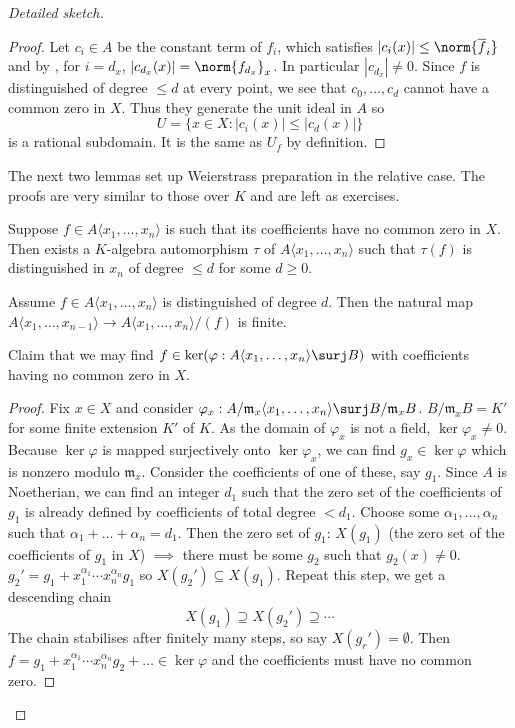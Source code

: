 \documentclass[a4paper]{article}
\begin{document}
\begin{proof}[Detailed sketch]
\begin{proof}
    Let \(c_i \in A\) be the constant term of \(f_i\), which satisfies \(|c_i(x)| \leq \norm{\overline f_i}\) and by , for \(i = d_x\), \(|c_{d_x}(x)| = \norm{f_{d_x}}_x\). In particular \(|c_{d_x}| \ne 0\). Since \(f\) is distinguished of degree \(\leq d\) at every point, we see that \(c_0, \dots, c_d\) cannot have a common zero in \(X\). Thus they generate the unit ideal in \(A\) so
    \[
      U = \{x \in X: |c_i(x)| \leq |c_d(x)|\}
    \]
    is a rational subdomain. It is the same as \(U_f\) by definition.
  \end{proof}

  The next two lemmas set up Weierstrass preparation in the relative case. The proofs are very similar to those over \(K\) and are left as exercises.
  
  \begin{lemma}
    Suppose \(f \in A \langle x_1, \dots, x_n \rangle\) is such that its coefficients have no common zero in \(X\). Then exists a \(K\)-algebra automorphism \(\tau\) of \(A \langle x_1, \dots, x_n\rangle\) such that \(\tau(f)\) is distinguished in \(x_n\) of degree \(\leq d\) for some \(d \geq 0\).
  \end{lemma}

  \begin{lemma}
    Assume \(f \in A\langle x_1, \dots, x_n \rangle\) is distinguished of degree \(d\). Then the natural map \(A \langle x_1, \dots, x_{n - 1} \rangle \to A \langle x_1, \dots, x_n\rangle/(f)\) is finite.
  \end{lemma}

  Claim that we may find \(f \in \ker (\varphi: A \langle x_1, \dots, x_n \rangle \surj B)\) with coefficients having no common zero in \(X\).

  \begin{proof}
    Fix \(x \in X\) and consider \(\varphi_x: A/\mathfrak m_x\langle x_1, \dots, x_n \rangle \surj B/\mathfrak m_x B\). \(B/\mathfrak m_x B = K'\) for some finite extension \(K'\) of \(K\). As the domain of \(\varphi_x\) is not a field, \(\ker \varphi_x \ne 0\). Because \(\ker \varphi\) is mapped surjectively onto \(\ker \varphi_x\), we can find \(g_x \in \ker \varphi\) which is nonzero modulo \(\mathfrak m_x\). Consider the coefficients of one of these, say \(g_1\). Since \(A\) is Noetherian, we can find an integer \(d_1\) such that the zero set of the coefficients of \(g_1\) is already defined by coefficients of total degree \(< d_1\). Choose some \(\alpha_1, \dots, \alpha_n\) such that \(\alpha_1 + \dots + \alpha_n = d_1\). Then the zero set of \(g_1\): \(X(g_1)\) (the zero set of the coefficients of \(g_1\) in \(X\)) \(\implies\) there must be some \(g_2\) such that \(g_2(x) \ne 0\). \(g_2' = g_1 + x_1^{\alpha_1} \cdots x_n^{\alpha_n} g_1\) so \(X(g_2') \subseteq X(g_1)\). Repeat this step, we get a descending chain
    \[
      X(g_1) \supseteq X(g_2') \supseteq \cdots
    \]
    The chain stabilises after finitely many steps, so say \(X(g_r') = \emptyset\). Then \(f = g_1 + x_1^{\alpha_1} \cdots x_n^{\alpha_n} g_2 + \dots \in \ker \varphi\) and the coefficients must have no common zero.
  \end{proof}


\end{proof}
\end{document}
